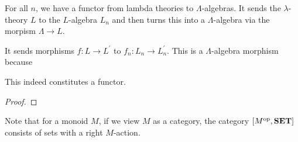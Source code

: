 \begin{definition}
  For all $ n $, we have a functor from lambda theories to $ \Lambda $-algebras. It sends the $ \lambda $-theory $ L $ to the $ L $-algebra $ L_n $ and then turns this into a $ \Lambda $-algebra via the morpism $ \Lambda \to L $.

  It sends morphisms $ f: L \to L^\prime $ to $ f_n : L_n \to L^\prime_n $. This is a $ \Lambda $-algebra morphism because \TODO
\end{definition}

\begin{lemma}
  This indeed constitutes a functor.
\end{lemma}
\begin{proof}
  \TODO
\end{proof}

\begin{remark}
  Note that for a monoid $ M $, if we view $ M $ as a category, the category $ [M^{\text{op}}, \mathbf{SET}] $ consists of sets with a right $ M $-action.
\end{remark}

